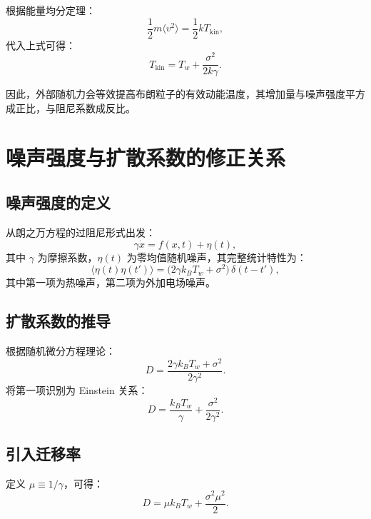 \documentclass[a4paper]{report} %
\begin{document}
根据能量均分定理：
\begin{equation}
\frac{1}{2} m \langle v^2 \rangle = \frac{1}{2} k T_{\text{kin}},
\end{equation}
代入上式可得：
\begin{equation}
T_{\text{kin}} = T_w + \frac{\sigma^2}{2k\gamma}.
\end{equation}

因此，外部随机力会等效提高布朗粒子的有效动能温度，其增加量与噪声强度平方成正比，与阻尼系数成反比。

\section{噪声强度与扩散系数的修正关系}

\subsection{噪声强度的定义}
从朗之万方程的过阻尼形式出发：
\begin{equation}
\gamma \dot{x} = f(x,t) + \eta(t),
\end{equation}
其中 $\gamma$ 为摩擦系数，$\eta(t)$ 为零均值随机噪声，其完整统计特性为：
\begin{equation}
\langle \eta(t)\eta(t') \rangle = \big( 2\gamma k_B T_w + \sigma^2 \big) \, \delta(t-t'),
\end{equation}
其中第一项为热噪声，第二项为外加电场噪声。

\subsection{扩散系数的推导}
根据随机微分方程理论：
\begin{equation}
D = \frac{2\gamma k_B T_w + \sigma^2}{2\gamma^2}.
\end{equation}
将第一项识别为 Einstein 关系：
\begin{equation}
D = \frac{k_B T_w}{\gamma} + \frac{\sigma^2}{2\gamma^2}.
\end{equation}

\subsection{引入迁移率}
定义 $\mu \equiv 1/\gamma$，可得：
\begin{equation}
D = \mu k_B T_w + \frac{\sigma^2 \mu^2}{2}.
\end{equation}
\end{document}

